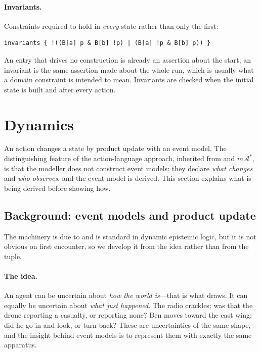 \documentclass[11pt,a4paper]{article}
\begin{document}
\paragraph{Invariants.}
Constraints required to hold in \emph{every} state rather than only the first:
\begin{lstlisting}
invariants { !((B[a] p & B[b] !p) | (B[a] !p & B[b] p)) }
\end{lstlisting}
An  entry that drives no construction is already an assertion about the start;
an invariant is the same assertion made about the whole run, which is usually what a domain
constraint is intended to mean. Invariants are checked when the initial state is built and
after every action.

\section{Dynamics}
\label{sec:dynamics}

An action changes a state by product update with an event model. The distinguishing feature of
the action-language approach, inherited from \mB{} and $m\mathcal{A}^*$, is that the modeller
does not construct event models: they declare \emph{what changes} and \emph{who observes},
and the event model is derived. This section explains what is being derived before showing
how.

\subsection{Background: event models and product update}
\label{sec:eventbackground}

The machinery is due to \citet{baltag1998} and is standard in dynamic epistemic logic, but it
is not obvious on first encounter, so we develop it from the idea rather than from the tuple.

\paragraph{The idea.}
An agent can be uncertain about \emph{how the world is}---that is what
 draws. It can equally be uncertain about \emph{what just happened}. The
radio crackles; was that the drone reporting a casualty, or reporting none? Ben moves toward
the east wing; did he go in and look, or turn back? These are uncertainties of the same shape,
and
the insight behind event models is to represent them with exactly the same apparatus.
\end{document}
